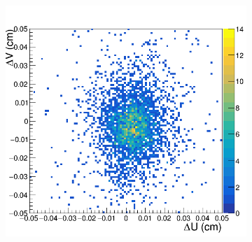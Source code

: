 \begin{figure}[h!]
\centering
 \begin{subfigure}[l]{.45\textwidth}
   \centering
   \includegraphics[width=\linewidth]{thesis_figures/alignment/Run_3211_after_prev/square/MX1.png}


\end{subfigure}
\end{figure}
